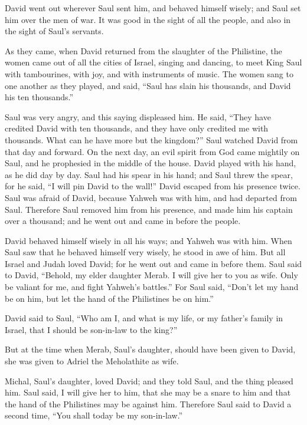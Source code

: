 David went out wherever Saul sent him, and behaved
himself wisely; and Saul set him over the men of war. It was good in the
sight of all the people, and also in the sight of Saul's servants.

 As they came, when David returned from the slaughter of
the Philistine, the women came out of all the cities of Israel, singing
and dancing, to meet King Saul with tambourines, with joy, and with
instruments of music.  The women sang to one another as
they played, and said, ``Saul has slain his thousands, and David his ten
thousands.''

 Saul was very angry, and this saying displeased him. He
said, ``They have credited David with ten thousands, and they have only
credited me with thousands. What can he have more but the kingdom?''
 Saul watched David from that day and forward.
 On the next day, an evil spirit from God came mightily
on Saul, and he prophesied in the middle of the house. David played with
his hand, as he did day by day. Saul had his spear in his hand;
 and Saul threw the spear, for he said, ``I will pin
David to the wall!'' David escaped from his presence twice.
 Saul was afraid of David, because Yahweh was with him,
and had departed from Saul.  Therefore Saul removed him
from his presence, and made him his captain over a thousand; and he went
out and came in before the people.

 David behaved himself wisely in all his ways; and Yahweh
was with him.  When Saul saw that he behaved himself very
wisely, he stood in awe of him.  But all Israel and Judah
loved David; for he went out and came in before them. 
Saul said to David, ``Behold, my elder daughter Merab. I will give her
to you as wife. Only be valiant for me, and fight Yahweh's battles.''
For Saul said, ``Don't let my hand be on him, but let the hand of the
Philistines be on him.''

 David said to Saul, ``Who am I, and what is my life, or
my father's family in Israel, that I should be son-in-law to the king?''

 But at the time when Merab, Saul's daughter, should have
been given to David, she was given to Adriel the Meholathite as wife.

 Michal, Saul's daughter, loved David; and they told
Saul, and the thing pleased him.  Saul said, I will give
her to him, that she may be a snare to him and that the hand of the
Philistines may be against him. Therefore Saul said to David a second
time, ``You shall today be my son-in-law.''

